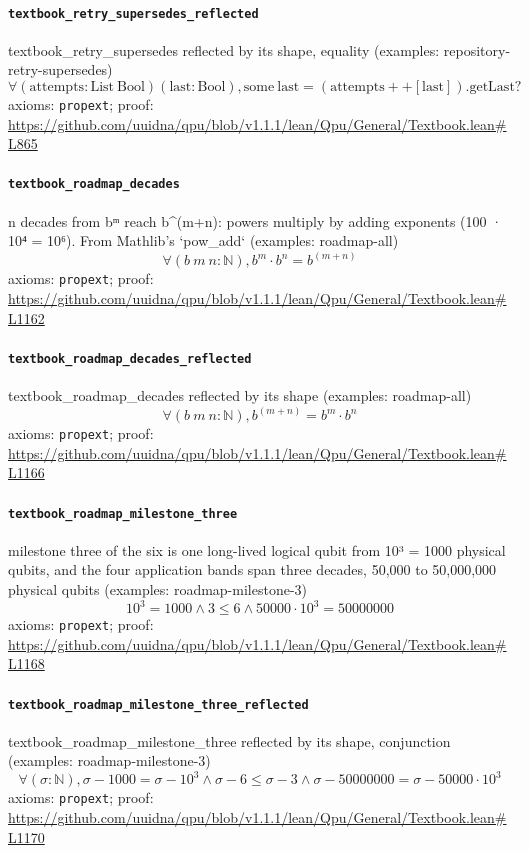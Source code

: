 \documentclass[11pt]{article}
\begin{document}
\paragraph{\texttt{textbook\_retry\_supersedes\_reflected}}
textbook\_retry\_supersedes reflected by its shape, equality (examples: repository-retry-supersedes)
\[ \forall (\mathrm{attempts} : \mathrm{List}\ \mathrm{Bool}) (\mathrm{last} : \mathrm{Bool}), \mathrm{some}\ \mathrm{last} = (\mathrm{attempts} ++ [\mathrm{last}])\mathrm{.getLast}? \]
\noindent axioms: \texttt{propext}; proof: \url{https://github.com/uuidna/qpu/blob/v1.1.1/lean/Qpu/General/Textbook.lean\#L865}

\paragraph{\texttt{textbook\_roadmap\_decades}}
n decades from bᵐ reach b\^{}(m+n): powers multiply by adding exponents (100 · 10⁴ = 10⁶). From Mathlib's `pow\_add` (examples: roadmap-all)
\[ \forall (b\ m\ n : \mathbb{N}), b ^{m} \cdot b ^{n} = b ^{(m + n)} \]
\noindent axioms: \texttt{propext}; proof: \url{https://github.com/uuidna/qpu/blob/v1.1.1/lean/Qpu/General/Textbook.lean\#L1162}

\paragraph{\texttt{textbook\_roadmap\_decades\_reflected}}
textbook\_roadmap\_decades reflected by its shape (examples: roadmap-all)
\[ \forall (b\ m\ n : \mathbb{N}), b ^{(m + n)} = b ^{m} \cdot b ^{n} \]
\noindent axioms: \texttt{propext}; proof: \url{https://github.com/uuidna/qpu/blob/v1.1.1/lean/Qpu/General/Textbook.lean\#L1166}

\paragraph{\texttt{textbook\_roadmap\_milestone\_three}}
milestone three of the six is one long-lived logical qubit from 10³ = 1000 physical qubits, and the four application bands span three decades, 50,000 to 50,000,000 physical qubits (examples: roadmap-milestone-3)
\[ 10 ^{3} = 1000 \land 3 \le 6 \land 50000 \cdot 10 ^{3} = 50000000 \]
\noindent axioms: \texttt{propext}; proof: \url{https://github.com/uuidna/qpu/blob/v1.1.1/lean/Qpu/General/Textbook.lean\#L1168}

\paragraph{\texttt{textbook\_roadmap\_milestone\_three\_reflected}}
textbook\_roadmap\_milestone\_three reflected by its shape, conjunction (examples: roadmap-milestone-3)
\[ \forall (\sigma : \mathbb{N}), \sigma - 1000 = \sigma - 10 ^{3} \land \sigma - 6 \le \sigma - 3 \land \sigma - 50000000 = \sigma - 50000 \cdot 10 ^{3} \]
\noindent axioms: \texttt{propext}; proof: \url{https://github.com/uuidna/qpu/blob/v1.1.1/lean/Qpu/General/Textbook.lean\#L1170}
\end{document}
